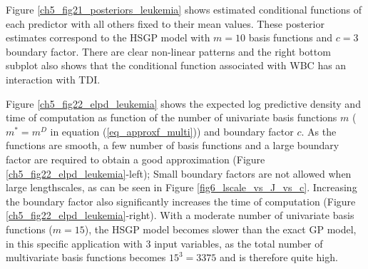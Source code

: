 \documentclass[onecolumn,a4paper,11pt]{article}
\begin{document}
Figure \ref{ch5_fig21_posteriors_leukemia} shows estimated conditional functions of each predictor with all others fixed to their mean values. These posterior estimates correspond to the HSGP model with $m=10$ basis functions and $c=3$ boundary factor. There are clear  non-linear patterns and the right bottom subplot also shows that the conditional function associated with WBC has an interaction with TDI.

Figure \ref{ch5_fig22_elpd_leukemia} shows the expected log predictive density \citep[ELPD; ][]{vehtari_2012,Vehtari+Gelman+Gabry:2017_practical} and time of computation as function of the number of univariate basis functions $m$ ($m^{\ast}=m^D$ in equation (\ref{eq_approxf_multi})) and boundary factor $c$. As the functions are smooth, a few number of basis functions and a large boundary factor are required to obtain a good approximation (Figure \ref{ch5_fig22_elpd_leukemia}-left); Small boundary factors are not allowed when large lengthscales, as can be seen in Figure \ref{fig6_lscale_vs_J_vs_c}. Increasing the boundary factor also significantly increases the time of computation (Figure \ref{ch5_fig22_elpd_leukemia}-right). With a moderate number of univariate basis functions ($m=15$), the HSGP model becomes slower than the exact GP model, in this specific application with $3$ input variables, as the total number of multivariate basis functions becomes $15^3 = 3375$ and is therefore quite high. 
%
\end{document}

